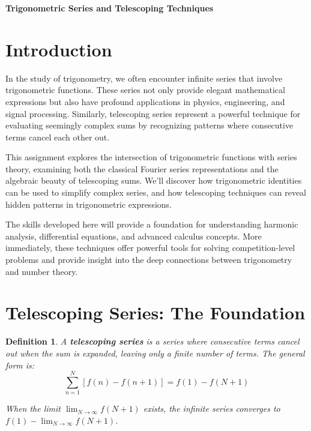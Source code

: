\documentclass[12pt]{article}
\newtheorem{definition}{Definition}
\begin{document}
\begin{center}
\textbf{\Large Trigonometric Series and Telescoping Techniques} \\
\vspace{0.5cm}
\hspace{0.1\textwidth}
\end{center}

\vspace{0.5cm}

\section{Introduction}

In the study of trigonometry, we often encounter infinite series that involve trigonometric functions. These series not only provide elegant mathematical expressions but also have profound applications in physics, engineering, and signal processing. Similarly, telescoping series represent a powerful technique for evaluating seemingly complex sums by recognizing patterns where consecutive terms cancel each other out.

This assignment explores the intersection of trigonometric functions with series theory, examining both the classical Fourier series representations and the algebraic beauty of telescoping sums. We'll discover how trigonometric identities can be used to simplify complex series, and how telescoping techniques can reveal hidden patterns in trigonometric expressions.

The skills developed here will provide a foundation for understanding harmonic analysis, differential equations, and advanced calculus concepts. More immediately, these techniques offer powerful tools for solving competition-level problems and provide insight into the deep connections between trigonometry and number theory.

\section{Telescoping Series: The Foundation}

\begin{definition}
A \textbf{telescoping series} is a series where consecutive terms cancel out when the sum is expanded, leaving only a finite number of terms. The general form is:
$$\sum_{n=1}^{N} [f(n) - f(n+1)] = f(1) - f(N+1)$$

When the limit $\lim_{N \to \infty} f(N+1)$ exists, the infinite series converges to $f(1) - \lim_{N \to \infty} f(N+1)$.
\end{definition}
\end{document}
